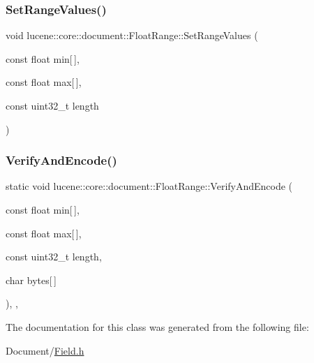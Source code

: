 \subsubsection{\texorpdfstring{Set\+Range\+Values()}{SetRangeValues()}}
{\footnotesize\ttfamily void lucene\+::core\+::document\+::\+Float\+Range\+::\+Set\+Range\+Values (\begin{DoxyParamCaption}\item[{const float}]{min\mbox{[}$\,$\mbox{]},  }\item[{const float}]{max\mbox{[}$\,$\mbox{]},  }\item[{const uint32\+\_\+t}]{length }\end{DoxyParamCaption})\hspace{0.3cm}{\ttfamily [inline]}}

\mbox{\label{classlucene_1_1core_1_1document_1_1FloatRange_aa0179c3af6585d4e262298013d543093}} 
\subsubsection{\texorpdfstring{Verify\+And\+Encode()}{VerifyAndEncode()}}
{\footnotesize\ttfamily static void lucene\+::core\+::document\+::\+Float\+Range\+::\+Verify\+And\+Encode (\begin{DoxyParamCaption}\item[{const float}]{min\mbox{[}$\,$\mbox{]},  }\item[{const float}]{max\mbox{[}$\,$\mbox{]},  }\item[{const uint32\+\_\+t}]{length,  }\item[{char}]{bytes\mbox{[}$\,$\mbox{]} }\end{DoxyParamCaption})\hspace{0.3cm}{\ttfamily [inline]}, {\ttfamily [static]}, {\ttfamily [private]}}



The documentation for this class was generated from the following file\+:\begin{DoxyCompactItemize}
\item 
Document/\mbox{\hyperlink{Document_2Field_8h}{Field.\+h}}\end{DoxyCompactItemize}
